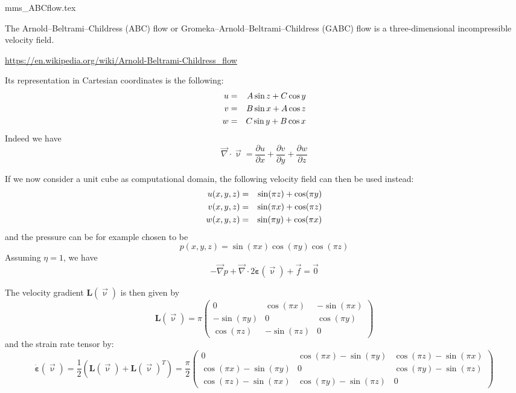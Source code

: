 \begin{flushright} {\tiny {\color{gray} mms\_ABCflow.tex}} \end{flushright}

The Arnold–Beltrami–Childress (ABC) flow or Gromeka–Arnold–Beltrami–Childress (GABC) flow is a three-dimensional incompressible velocity field. 

\url{https://en.wikipedia.org/wiki/Arnold-Beltrami-Childress_flow}

Its representation in Cartesian coordinates is the following:
\begin{eqnarray}
u &=& A\sin z +C \cos y \nonumber\\
v &=& B\sin x +A \cos z \nonumber\\
w &=& C\sin y +B \cos x \nonumber
\end{eqnarray}
Indeed we have
\[
\vec\nabla \cdot \vec\upnu = 
\frac{\partial u}{\partial x} +
\frac{\partial v}{\partial y} +
\frac{\partial w}{\partial z} 
\]

If we now consider a unit cube as computational domain, 
the following velocity field can then be used instead:
\begin{eqnarray}
u(x,y,z) &=& \sin (\pi z) + \cos (\pi y) \nonumber\\
v(x,y,z) &=& \sin (\pi x) + \cos (\pi z) \nonumber\\
w(x,y,z) &=& \sin (\pi y) + \cos (\pi x) \nonumber
\end{eqnarray}
and the pressure can be for example chosen to be 
\[
p(x,y,z)=\sin (\pi x) \cos(\pi y) \cos (\pi z)
\]
Assuming $\eta=1$, we have
\[
-\vec\nabla p + \vec\nabla \cdot 2\dot{\bm \varepsilon}(\vec\upnu) + \vec{f} = \vec{0}
\]

The velocity gradient ${\bm L}(\vec\upnu)$ is then given by
\[
{\bm L}(\vec\upnu) = \pi
\left(
\begin{array}{ccc}
0 & \cos (\pi x) & -\sin (\pi x) \\
-\sin (\pi y) & 0 & \cos (\pi y)  \\
\cos (\pi z) & -\sin (\pi z) & 0 
\end{array}
\right)
\]
and the strain rate tensor by:
\[
\dot{\bm \varepsilon}(\vec\upnu)
=\frac{1}{2}({\bm L}(\vec\upnu)+{\bm L}(\vec\upnu)^T)
=
\frac{\pi}{2}
\left(
\begin{array}{ccc}
0 &  \cos (\pi x) -\sin (\pi y)  & \cos (\pi z) -\sin (\pi x)\\
\cos (\pi x) -\sin (\pi y)  & 0 & \cos (\pi y)-\sin (\pi z)  \\
\cos (\pi z) -\sin (\pi x)  &  \cos (\pi y)-\sin (\pi z)  & 0
\end{array}
\right)
\]


